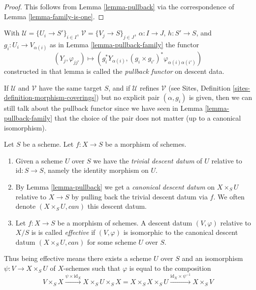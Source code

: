 \begin{proof}
This follows from Lemma \ref{lemma-pullback} via the
correspondence of Lemma \ref{lemma-family-is-one}.
\end{proof}

\begin{definition}
\label{definition-pullback-functor-family}
With $\mathcal{U} = \{U_i \to S'\}_{i \in I}$,
$\mathcal{V} = \{V_j \to S\}_{j \in J}$, $\alpha : I \to J$, $h : S' \to S$,
and $g_i : U_i \to V_{\alpha(i)}$ as in Lemma \ref{lemma-pullback-family}
the functor
$$
(Y_j, \varphi_{jj'}) \longmapsto
(g_i^*Y_{\alpha(i)}, (g_i \times g_{i'})^*\varphi_{\alpha(i)\alpha(i')})
$$
constructed in that lemma
is called the {\it pullback functor} on descent data.
\end{definition}

\noindent
If $\mathcal{U}$ and $\mathcal{V}$ have the same target $S$,
and if $\mathcal{U}$ refines $\mathcal{V}$ (see
Sites, Definition \ref{sites-definition-morphism-coverings})
but no explicit pair $(\alpha, g_i)$ is given, then we can still
talk about the pullback functor since we have seen in
Lemma \ref{lemma-pullback-family} that the choice of the pair does not matter
(up to a canonical isomorphism).


\begin{definition}
\label{definition-effective}
Let $S$ be a scheme.
Let $f : X \to S$ be a morphism of schemes.
\begin{enumerate}
\item  Given a scheme $U$ over $S$ we have the
{\it trivial descent datum} of $U$ relative to
$\text{id} : S \to S$, namely the identity morphism on $U$.
\item By Lemma \ref{lemma-pullback} we get a
{\it canonical descent datum} on $X \times_S U$
relative to $X \to S$ by pulling back the trivial
descent datum via $f$. We often
denote $(X \times_S U, can)$ this descent datum.
\item Let $f : X \to S$ be a morphism of schemes.
A descent datum $(V, \varphi)$ relative to $X/S$ is
is called {\it effective} if $(V, \varphi)$
is isomorphic to the canonical descent datum
$(X \times_S U, can)$ for some scheme $U$ over $S$.
\end{enumerate}
\end{definition}

\noindent
Thus being effective means there exists a scheme $U$
over $S$ and an isomorphism $\psi : V \to X \times_S U$
of $X$-schemes such that $\varphi$ is equal to the composition
$$
V \times_S X \xrightarrow{\psi \times \text{id}_X}
X \times_S U \times_S X =
X \times_S X \times_S U
\xrightarrow{\text{id}_X \times \psi^{-1}}
X \times_S V
$$

